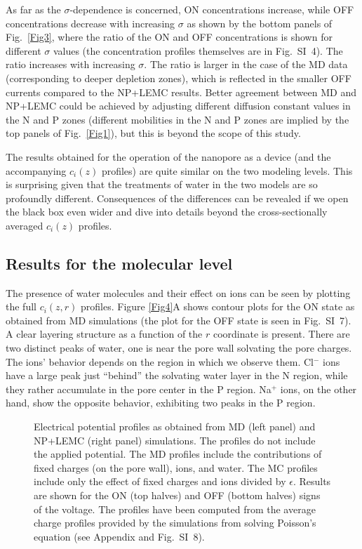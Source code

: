 \documentclass[fleqn,10pt]{SelfArx} %
\begin{document}
As far as the $\sigma$-dependence is concerned, ON concentrations increase, while OFF concentrations decrease with increasing $\sigma$ as shown by the bottom panels of Fig.\ \ref{Fig3}, where the ratio of the ON and OFF concentrations is shown for different $\sigma$ values (the concentration profiles themselves are in Fig.\ SI\ 4).
The ratio increases with increasing $\sigma$. 
The ratio is larger in the case of the MD data (corresponding to deeper depletion zones), which is reflected in the smaller OFF currents compared to the NP+LEMC results. 
Better agreement between MD and NP+LEMC could be achieved by adjusting different diffusion constant values in the N and P zones (different mobilities in the N and P zones are implied by the top panels of Fig.\ \ref{Fig1}), but this is beyond the scope of this study.

The results obtained for the operation of the nanopore as a device (and the accompanying $c_{i}(z)$ profiles) are quite similar on the two modeling levels.
This is surprising given that the treatments of water in the two models are so profoundly different. 
Consequences of the differences can be revealed if we open the black box even wider and dive into details beyond the cross-sectionally averaged $c_{i}(z)$ profiles.

\subsection*{Results for the molecular level}
The presence of water molecules and their effect on ions can be seen by plotting the full $c_{i}(z,r)$ profiles.
Figure \ref{Fig4}A shows contour plots for the ON state as obtained from MD simulations (the plot for the OFF state is seen in Fig.\ SI\ 7).
A clear layering structure as a function of the $r$ coordinate  is present.
There are two distinct peaks of water, one is near the pore wall solvating the pore charges. 
The ions' behavior depends on the region in which we observe them.
Cl$^{-}$ ions have a large peak just ``behind'' the solvating water layer in the N region, while they rather accumulate in the pore center in the P region.
Na$^{+}$ ions, on the other hand, show the opposite behavior, exhibiting two peaks in the P region.


\begin{figure*}[t]
 \begin{center}
 \end{center}
\caption{Electrical potential profiles as obtained from MD (left panel) and NP+LEMC (right panel) simulations. The profiles do not include the applied potential. The MD profiles include the contributions of fixed charges (on the pore wall), ions, and water. The MC profiles include only the effect of fixed charges and ions divided by $\epsilon$.
Results are shown for the ON (top halves) and OFF (bottom halves) signs of the voltage. 
The profiles have been computed from the average charge profiles provided by the simulations from solving Poisson's equation (see Appendix and Fig.\ SI\ 8).
}
\label{Fig5}
\end{figure*} 
\end{document}
